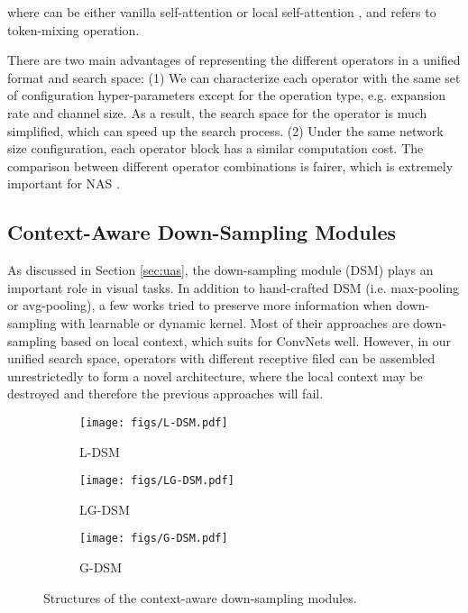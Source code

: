 \documentclass{article} \usepackage{iclr2022_conference,times}
\begin{document}
where  can be either vanilla self-attention or local self-attention , and  refers to token-mixing operation.

There are two main advantages of representing the different operators in a unified format and search space: (1) We can characterize each operator with the same set of configuration hyper-parameters except for the operation type, e.g. expansion rate and channel size. As a result, the search space for the operator is much simplified, which can speed up the search process. (2) Under the same network size configuration, each operator block has a similar computation cost. The comparison between different operator combinations is fairer, which is extremely important for NAS \citep{mnas}.

\subsection{Context-Aware Down-Sampling Modules}
\label{sec:dsm}

As discussed in Section \ref{sec:uas}, the down-sampling module (DSM) plays an important role in visual tasks. In addition to hand-crafted DSM (i.e. max-pooling or avg-pooling), a few works \citep{dpp,lip,carafe++} tried to preserve more information when down-sampling with learnable or dynamic kernel. Most of their approaches are down-sampling based on local context, which suits for ConvNets well. However, in our unified search space, operators with different receptive filed can be assembled unrestrictedly to form a novel architecture, where the local context may be destroyed and therefore the previous approaches will fail. 

\vspace{-1em}
\begin{figure}[h]
    \centering
     \begin{subfigure}[b]{0.15\textwidth}
         \centering
         \texttt{[image: figs/L-DSM.pdf]}
         \caption{L-DSM}
         \label{fig:ldsm}
     \end{subfigure}
     \hspace{3em} 
     \begin{subfigure}[b]{0.15\textwidth}
         \centering
         \texttt{[image: figs/LG-DSM.pdf]}
         \caption{LG-DSM}
         \label{fig:lgdsm}
     \end{subfigure}
     \hspace{3em} 
     \begin{subfigure}[b]{0.15\textwidth}
         \centering
         \texttt{[image: figs/G-DSM.pdf]}
         \caption{G-DSM}
         \label{fig:gdsm}
     \end{subfigure}
    \vspace{-0.5em}
    \caption{Structures of the context-aware down-sampling modules.}
    \label{fig:dsms}
   \vspace{-1.5em}
\end{figure}
\end{document}
